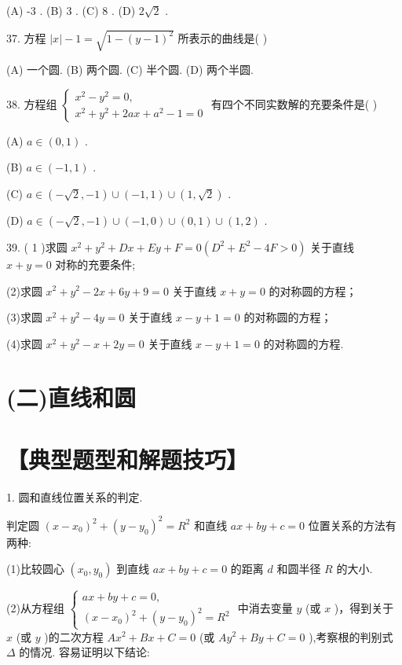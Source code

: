 \documentclass[10pt]{article}
\begin{document}
(A) -3 . (B) 3 . (C) 8 . (D) \(2\sqrt{2}\) .

37. 方程 \(\left| x\right|  - 1 = \sqrt{1 - {\left( y - 1\right) }^{2}}\) 所表示的曲线是( )

(A) 一个圆. (B) 两个圆. (C) 半个圆. (D) 两个半圆.

38. 方程组 \(\left\{  \begin{array}{l} {x}^{2} - {y}^{2} = 0, \\  {x}^{2} + {y}^{2} + {2ax} + {a}^{2} - 1 = 0 \end{array}\right.\) 有四个不同实数解的充要条件是( )

(A) \(a \in  \left( {0,1}\right)\) .

(B) \(a \in  \left( {-1,1}\right)\) .

(C) \(a \in  \left( {-\sqrt{2}, - 1}\right)  \cup  \left( {-1,1}\right)  \cup  \left( {1,\sqrt{2}}\right)\) .

(D) \(a \in  \left( {-\sqrt{2}, - 1}\right)  \cup  \left( {-1,0}\right)  \cup  \left( {0,1}\right)  \cup  \left( {1,2}\right)\) .

39. ( 1 )求圆 \({x}^{2} + {y}^{2} + {Dx} + {Ey} + F = 0\left( {{D}^{2} + {E}^{2} - {4F} > 0}\right)\) 关于直线 \(x + y = 0\) 对称的充要条件;

(2)求圆 \({x}^{2} + {y}^{2} - {2x} + {6y} + 9 = 0\) 关于直线 \(x + y = 0\) 的对称圆的方程；

(3)求圆 \({x}^{2} + {y}^{2} - {4y} = 0\) 关于直线 \(x - y + 1 = 0\) 的对称圆的方程；

(4)求圆 \({x}^{2} + {y}^{2} - x + {2y} = 0\) 关于直线 \(x - y + 1 = 0\) 的对称圆的方程.

\section*{(二)直线和圆}

\section*{【典型题型和解题技巧】}

1. 圆和直线位置关系的判定.

判定圆 \({\left( x - {x}_{0}\right) }^{2} + {\left( y - {y}_{0}\right) }^{2} = {R}^{2}\) 和直线 \({ax} + {by} + c = 0\) 位置关系的方法有两种:

(1)比较圆心 \(\left( {{x}_{0},{y}_{0}}\right)\) 到直线 \({ax} + {by} + c = 0\) 的距离 \(d\) 和圆半径 \(R\) 的大小.

(2)从方程组 \(\left\{  \begin{array}{l} {ax} + {by} + c = 0, \\  {\left( x - {x}_{0}\right) }^{2} + {\left( y - {y}_{0}\right) }^{2} = {R}^{2} \end{array}\right.\) 中消去变量 \(y\) (或 \(x\) )，得到关于 \(x\) (或 \(y\) )的二次方程 \(A{x}^{2} + {Bx} + C = 0\) (或 \(A{y}^{2} + {By} + C = 0\) ),考察根的判别式 \(\Delta\) 的情况. 容易证明以下结论:
\end{document}
